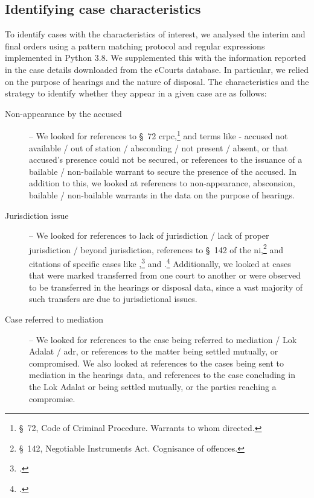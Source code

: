 \subsection{Identifying case characteristics} \label{sec:text-mining}

To identify cases with the characteristics of interest, we analysed the interim and final orders using a pattern matching protocol and regular expressions implemented in Python 3.8. We supplemented this with the information reported in the case details downloaded from the eCourts database. In particular, we relied on the purpose of hearings and the nature of disposal. The characteristics and the strategy to identify whether they appear in a given case are as follows:

\begin{description}
\item [Non-appearance by the accused] -- We looked for references to \S~72 \gls{crpc},\footnote{\S~72, Code of Criminal Procedure. Warrants to whom directed.} and terms like - accused not available / out of station / absconding / not present / absent, or that accused’s presence could not be secured, or references to the issuance of a bailable / non-bailable warrant to secure the presence of the accused. In addition to this, we looked at references to non-appearance, absconsion, bailable / non-bailable warrants in the data on the purpose of hearings.

\item[]

\item [Jurisdiction issue] -- We looked for references to lack of jurisdiction / lack of proper jurisdiction / beyond jurisdiction, references to \S~142 of the \gls{ni},\footnote{\S~142, Negotiable Instruments Act. Cognisance of offences.} and citations of specific cases like ,\footcite{sc2014_dhanuka} and .\footcite{sc2016_carbon} Additionally, we looked at cases that were marked transferred from one court to another or were observed to be transferred in the hearings or disposal data, since a vast majority of such transfers are due to jurisdictional issues.

\item[]

\item [Case referred to mediation] -- We looked for references to the case being referred to mediation / Lok Adalat / \gls{adr}, or references to the matter being settled mutually, or compromised. We also looked at references to the cases being sent to mediation in the hearings data, and references to the case concluding in the Lok Adalat or being settled mutually, or the parties reaching a compromise.


\end{description}
